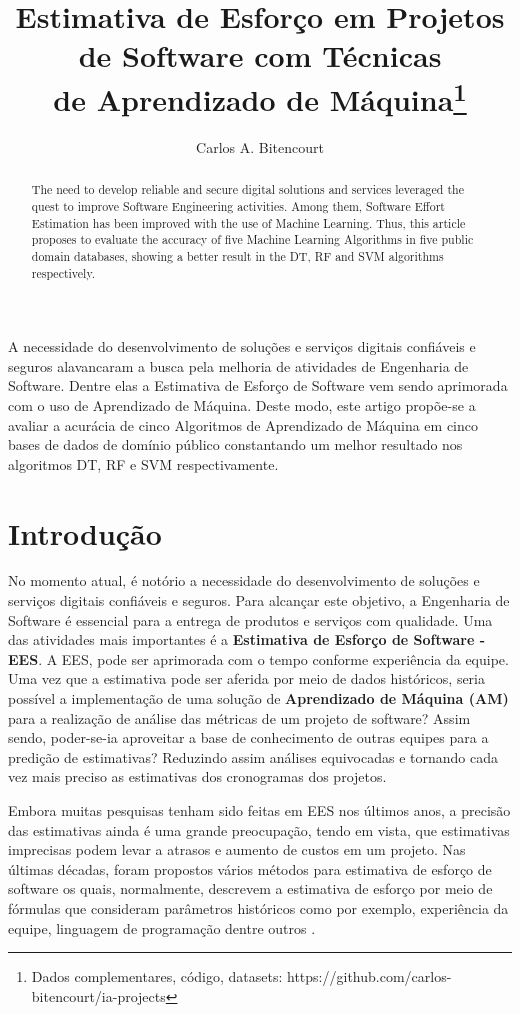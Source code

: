 \documentclass[12pt]{article}
\title{Estimativa de Esforço em Projetos de Software com Técnicas\\ de Aprendizado de Máquina\footnote{Dados complementares, código, datasets: https://github.com/carlos-bitencourt/ia-projects}}
\author{Carlos A. Bitencourt\inst{1}}
\begin{document}
\maketitle

\begin{abstract}
  The need to develop reliable and secure digital solutions and services leveraged the quest to improve Software Engineering activities. Among them, Software Effort Estimation has been improved with the use of Machine Learning. Thus, this article proposes to evaluate the accuracy of five Machine Learning Algorithms in five public domain databases, showing a better result in the DT, RF and SVM algorithms respectively.
\end{abstract}

\begin{resumo}
  A necessidade do desenvolvimento de soluções e serviços digitais confiáveis e seguros alavancaram a busca pela melhoria de atividades de Engenharia de Software. Dentre elas a Estimativa de Esforço de Software vem sendo aprimorada com o uso de Aprendizado de Máquina. Deste modo, este artigo propõe-se a avaliar a acurácia de cinco Algoritmos de Aprendizado de Máquina em cinco bases de dados de domínio público constantando um melhor resultado nos algoritmos DT, RF e SVM respectivamente.

\end{resumo}

\section{Introdução}

No momento atual, é notório a necessidade do desenvolvimento de soluções e serviços digitais confiáveis e seguros. Para alcançar este objetivo, a Engenharia de Software é essencial para a entrega de produtos e serviços com qualidade. Uma das atividades mais importantes é a \textbf{Estimativa de Esforço de Software - EES}. A EES, pode ser aprimorada com o tempo conforme experiência da equipe. Uma vez que a estimativa pode ser aferida por meio de dados históricos, seria possível a implementação de uma solução de \textbf{Aprendizado de Máquina (AM)} para a realização de análise das métricas de um projeto de software? Assim sendo, poder-se-ia aproveitar a base de conhecimento de outras equipes para a predição de estimativas? Reduzindo assim análises equivocadas e tornando cada vez mais preciso as estimativas dos cronogramas dos projetos.

Embora muitas pesquisas tenham sido feitas em EES nos últimos anos, a precisão das estimativas  ainda é uma grande preocupação, tendo em vista, que estimativas imprecisas podem levar a atrasos e aumento de custos em um projeto. Nas últimas décadas, foram propostos vários métodos para estimativa de esforço de software os quais, normalmente, descrevem a estimativa de esforço por meio de fórmulas que consideram parâmetros históricos como por exemplo, experiência da equipe, linguagem de programação dentre outros \cite{asadegravino:2019}.
\end{document}
